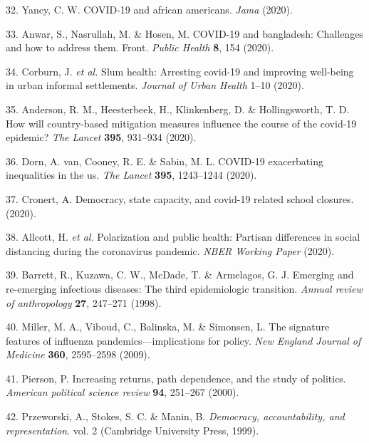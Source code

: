 \documentclass[
]{article}
\newenvironment{cslreferences}%
  {}%
  {\par}
\begin{document}
\begin{cslreferences}
\leavevmode\hypertarget{ref-yancy2020covid}{}%
32. Yancy, C. W. COVID-19 and african americans. \emph{Jama} (2020).

\leavevmode\hypertarget{ref-anwar2020covid}{}%
33. Anwar, S., Nasrullah, M. \& Hosen, M. COVID-19 and bangladesh: Challenges and how to address them. Front. \emph{Public Health} \textbf{8}, 154 (2020).

\leavevmode\hypertarget{ref-corburn2020slum}{}%
34. Corburn, J. \emph{et al.} Slum health: Arresting covid-19 and improving well-being in urban informal settlements. \emph{Journal of Urban Health} 1--10 (2020).

\leavevmode\hypertarget{ref-anderson2020will}{}%
35. Anderson, R. M., Heesterbeek, H., Klinkenberg, D. \& Hollingsworth, T. D. How will country-based mitigation measures influence the course of the covid-19 epidemic? \emph{The Lancet} \textbf{395}, 931--934 (2020).

\leavevmode\hypertarget{ref-van2020covid}{}%
36. Dorn, A. van, Cooney, R. E. \& Sabin, M. L. COVID-19 exacerbating inequalities in the us. \emph{The Lancet} \textbf{395}, 1243--1244 (2020).

\leavevmode\hypertarget{ref-cronert2020democracy}{}%
37. Cronert, A. Democracy, state capacity, and covid-19 related school closures. (2020).

\leavevmode\hypertarget{ref-allcott2020polarization}{}%
38. Allcott, H. \emph{et al.} Polarization and public health: Partisan differences in social distancing during the coronavirus pandemic. \emph{NBER Working Paper} (2020).

\leavevmode\hypertarget{ref-barrett1998emerging}{}%
39. Barrett, R., Kuzawa, C. W., McDade, T. \& Armelagos, G. J. Emerging and re-emerging infectious diseases: The third epidemiologic transition. \emph{Annual review of anthropology} \textbf{27}, 247--271 (1998).

\leavevmode\hypertarget{ref-miller2009signature}{}%
40. Miller, M. A., Viboud, C., Balinska, M. \& Simonsen, L. The signature features of influenza pandemics---implications for policy. \emph{New England Journal of Medicine} \textbf{360}, 2595--2598 (2009).

\leavevmode\hypertarget{ref-pierson2000increasing}{}%
41. Pierson, P. Increasing returns, path dependence, and the study of politics. \emph{American political science review} \textbf{94}, 251--267 (2000).

\leavevmode\hypertarget{ref-przeworski1999democracy}{}%
42. Przeworski, A., Stokes, S. C. \& Manin, B. \emph{Democracy, accountability, and representation}. vol. 2 (Cambridge University Press, 1999).


\end{cslreferences}
\end{document}
